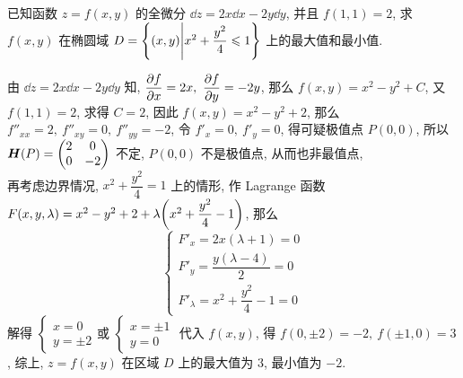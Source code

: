 \begin{example}[2005 数二]
    已知函数 $z=f(x,y)$ 的全微分 $\dd z=2x\dd x-2y\dd y$, 并且 $f(1,1)=2$, 求 $f(x,y)$ 在椭圆域 $D=\qty{(x,y)\Bigg| x^2+\dfrac{y^2}{4}\leqslant  1 }$ 上的最大值和最小值.
\end{example}
\begin{solution}
    由 $\dd z=2x\dd x-2y\dd y$ 知, $\displaystyle\pdv{f}{x}=2x,~\pdv{f}{y}=-2y$, 那么 $f(x,y)=x^2-y^2+C$, 又 $f(1,1)=2$, 求得 $C=2$, 因此 $f(x,y)=x^2-y^2+2$, 那么 $f''_{xx}=2,~f''_{xy}=0,~f''_{yy}=-2$, 
    令 $f'_x=0,~f'_y=0$, 得可疑极值点 $P(0,0)$, 所以 $\vb*{H}(P)=\mqty(2&0\\0&-2)$ 不定, $P(0,0)$ 不是极值点, 从而也非最值点, \\ 
    再考虑边界情况, $x^2+\dfrac{y^2}{4}=1$ 上的情形, 作 Lagrange 函数 $F(x,y,\lambda)=x^2-y^2+2+\lambda\qty(x^2+\dfrac{y^2}{4}-1)$, 那么 
    $$\begin{cases}
        F'_x=2 x (\lambda + 1)=0\\ 
        F'_y=\dfrac{y (\lambda - 4)}{2}=0\\ 
        F'_\lambda=x^2+\dfrac{y^2}{4}-1=0
    \end{cases}$$ 解得 $\begin{cases}
        x=0\\ y=\pm2
    \end{cases}\text{或 }\begin{cases}
        x=\pm 1\\ y=0
    \end{cases}$ 代入 $f(x,y)$, 得 $f(0,\pm 2)=-2,~f(\pm1,0)=3$, 综上, $z=f(x,y)$ 在区域 $D$ 上的最大值为 $3$, 最小值为 $-2$.
\end{solution}


